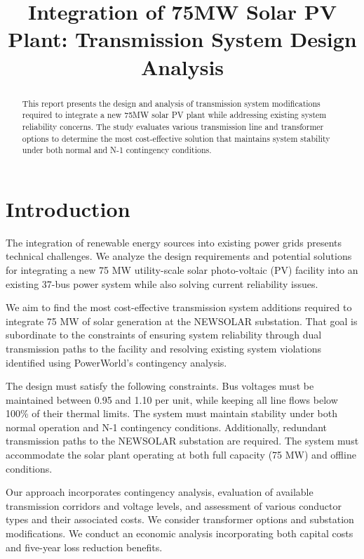 \documentclass[conference]{IEEEtran}
\begin{document}
	
	\title{Integration of 75MW Solar PV Plant: Transmission System Design Analysis}
	
	\author{
	}
	
	\maketitle
	
\begin{abstract}
	This report presents the design and analysis of transmission system modifications required to integrate a new 75MW solar PV plant while addressing existing system reliability concerns. The study evaluates various transmission line and transformer options to determine the most cost-effective solution that maintains system stability under both normal and N-1 contingency conditions.
\end{abstract}

\section{Introduction}
The integration of renewable energy sources into existing power grids presents technical challenges. We analyze the design requirements and potential solutions for integrating a new 75 MW utility-scale solar photo-voltaic (PV) facility into an existing 37-bus power system while also solving current reliability issues.

We aim to find the most cost-effective transmission system additions required to integrate 75 MW of solar generation at the NEWSOLAR substation. That goal is subordinate to the constraints of ensuring system reliability through dual transmission paths to the facility and resolving existing system violations identified using PowerWorld's contingency analysis.

The design must satisfy the following constraints. Bus voltages must be maintained between 0.95 and 1.10 per unit, while keeping all line flows below 100\% of their thermal limits. The system must maintain stability under both normal operation and N-1 contingency conditions. Additionally, redundant transmission paths to the NEWSOLAR substation are required. The system must accommodate the solar plant operating at both full capacity (75 MW) and offline conditions.

Our approach incorporates contingency analysis, evaluation of available transmission corridors and voltage levels, and assessment of various conductor types and their associated costs. We consider transformer options and substation modifications. We conduct an economic analysis incorporating both capital costs and five-year loss reduction benefits.
\end{document}

